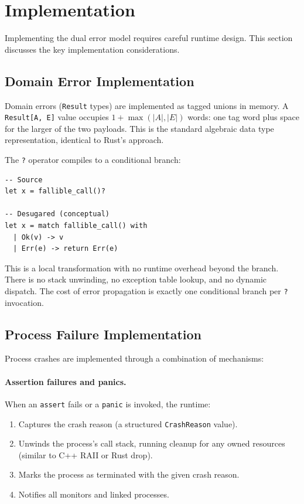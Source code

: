 \documentclass[11pt,twocolumn]{article}
\newcommand{\Result}{\texttt{Result}}
\begin{document}
\section{Implementation}\label{sec:implementation}

Implementing the dual error model requires careful runtime design. This section discusses the key implementation considerations.

\subsection{Domain Error Implementation}

Domain errors (\Result{} types) are implemented as tagged unions in memory. A \texttt{Result[A, E]} value occupies $1 + \max(|A|, |E|)$ words: one tag word plus space for the larger of the two payloads. This is the standard algebraic data type representation, identical to Rust's approach.

The \texttt{?} operator compiles to a conditional branch:

\begin{lstlisting}
-- Source
let x = fallible_call()?

-- Desugared (conceptual)
let x = match fallible_call() with
  | Ok(v) -> v
  | Err(e) -> return Err(e)
\end{lstlisting}

This is a local transformation with no runtime overhead beyond the branch. There is no stack unwinding, no exception table lookup, and no dynamic dispatch. The cost of error propagation is exactly one conditional branch per \texttt{?} invocation.

\subsection{Process Failure Implementation}

Process crashes are implemented through a combination of mechanisms:

\paragraph{Assertion failures and panics.} When an \texttt{assert} fails or a \texttt{panic} is invoked, the runtime:
\begin{enumerate}
  \item Captures the crash reason (a structured \texttt{CrashReason} value).
  \item Unwinds the process's call stack, running cleanup for any owned resources (similar to C++ RAII or Rust drop).
  \item Marks the process as terminated with the given crash reason.
  \item Notifies all monitors and linked processes.
\end{enumerate}
\end{document}
